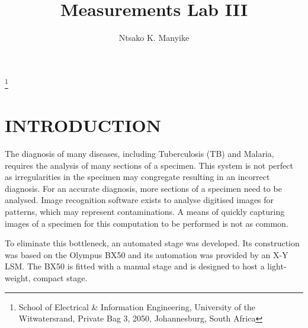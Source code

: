 \documentclass[10pt,twocolumn]{witseiepaper}
\begin{document}
\title{Measurements Lab III}

\author{Ntsako K. Manyike}

\thanks{School of Electrical \& Information Engineering, University of the
Witwatersrand, Private Bag 3, 2050, Johannesburg, South Africa}



%



\maketitle
\thispagestyle{empty}\pagestyle{empty}


%
\section{INTRODUCTION}

The diagnosis of many diseases, including Tuberculosis (TB) and Malaria,
requires the analysis of many sections of a specimen.  This system is not
perfect as irregularities in the specimen may congregate resulting in an
incorrect diagnosis.  For an accurate diagnosis, more sections of a specimen
need to be analysed.  Image recognition software exists to analyse digitised
images for patterns, which may represent contaminations.  A means of quickly
capturing images of a specimen for this computation to be performed is not as
common.  

To eliminate this bottleneck, an automated stage was developed.  Its
construction was based on the Olympus BX50 \cite{Olympus} and its automation
was provided by an X-Y LSM.  The BX50 is fitted with a manual stage and is
designed to host a light-weight, compact stage.
\end{document}
